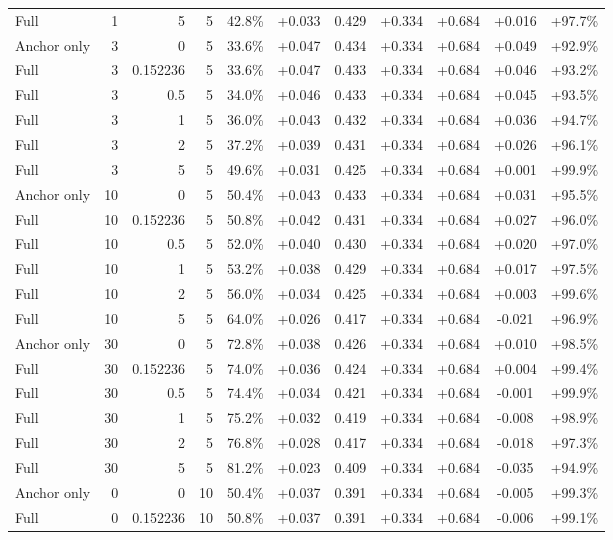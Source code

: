 \begin{table}[htbp]
\begin{tabular}{lrrrccccccc}
Full & 1 & 5 & 5 & 42.8\% & +0.033 & 0.429 & +0.334 & +0.684 & +0.016 & +97.7\% \\
Anchor only & 3 & 0 & 5 & 33.6\% & +0.047 & 0.434 & +0.334 & +0.684 & +0.049 & +92.9\% \\
Full & 3 & 0.152236 & 5 & 33.6\% & +0.047 & 0.433 & +0.334 & +0.684 & +0.046 & +93.2\% \\
Full & 3 & 0.5 & 5 & 34.0\% & +0.046 & 0.433 & +0.334 & +0.684 & +0.045 & +93.5\% \\
Full & 3 & 1 & 5 & 36.0\% & +0.043 & 0.432 & +0.334 & +0.684 & +0.036 & +94.7\% \\
Full & 3 & 2 & 5 & 37.2\% & +0.039 & 0.431 & +0.334 & +0.684 & +0.026 & +96.1\% \\
Full & 3 & 5 & 5 & 49.6\% & +0.031 & 0.425 & +0.334 & +0.684 & +0.001 & +99.9\% \\
Anchor only & 10 & 0 & 5 & 50.4\% & +0.043 & 0.433 & +0.334 & +0.684 & +0.031 & +95.5\% \\
Full & 10 & 0.152236 & 5 & 50.8\% & +0.042 & 0.431 & +0.334 & +0.684 & +0.027 & +96.0\% \\
Full & 10 & 0.5 & 5 & 52.0\% & +0.040 & 0.430 & +0.334 & +0.684 & +0.020 & +97.0\% \\
Full & 10 & 1 & 5 & 53.2\% & +0.038 & 0.429 & +0.334 & +0.684 & +0.017 & +97.5\% \\
Full & 10 & 2 & 5 & 56.0\% & +0.034 & 0.425 & +0.334 & +0.684 & +0.003 & +99.6\% \\
Full & 10 & 5 & 5 & 64.0\% & +0.026 & 0.417 & +0.334 & +0.684 & -0.021 & +96.9\% \\
Anchor only & 30 & 0 & 5 & 72.8\% & +0.038 & 0.426 & +0.334 & +0.684 & +0.010 & +98.5\% \\
Full & 30 & 0.152236 & 5 & 74.0\% & +0.036 & 0.424 & +0.334 & +0.684 & +0.004 & +99.4\% \\
Full & 30 & 0.5 & 5 & 74.4\% & +0.034 & 0.421 & +0.334 & +0.684 & -0.001 & +99.9\% \\
Full & 30 & 1 & 5 & 75.2\% & +0.032 & 0.419 & +0.334 & +0.684 & -0.008 & +98.9\% \\
Full & 30 & 2 & 5 & 76.8\% & +0.028 & 0.417 & +0.334 & +0.684 & -0.018 & +97.3\% \\
Full & 30 & 5 & 5 & 81.2\% & +0.023 & 0.409 & +0.334 & +0.684 & -0.035 & +94.9\% \\
Anchor only & 0 & 0 & 10 & 50.4\% & +0.037 & 0.391 & +0.334 & +0.684 & -0.005 & +99.3\% \\
Full & 0 & 0.152236 & 10 & 50.8\% & +0.037 & 0.391 & +0.334 & +0.684 & -0.006 & +99.1\% \\

\end{tabular}
\end{table}
